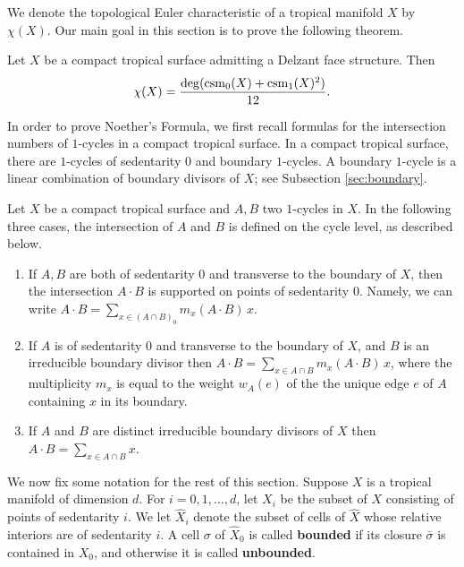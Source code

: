 We denote the topological Euler characteristic of a tropical manifold $X$ by $\chi(X)$.
Our main goal in this section is to prove the following theorem.  

\begin{thm}
\label{thm:Noether}
Let $X$ be a compact tropical surface admitting a Delzant face structure.
Then 
$$\chi(X) = \frac{\deg (\operatorname{csm}_0(X) + \operatorname{csm}_1(X)^2) }{12}.$$
\end{thm}




In order to prove Noether's Formula, we first recall formulas for the intersection numbers of $1$-cycles in a compact tropical surface. In a  compact tropical surface, there are  $1$-cycles of sedentarity $0$ and boundary $1$-cycles. A boundary $1$-cycle  is a linear combination of boundary divisors of $X$; see Subsection \ref{sec:boundary}. 


\begin{prop}\cite[Section 3.5]{Shaw:Surf}\label{prop:intersections}
Let $X$ be a compact tropical surface and $A, B$ two $1$-cycles in $X$. In the following three cases, the intersection of $A$ and $B$ is defined on the cycle level, as described below. 
\begin{enumerate}
\item If  $A, B$ are both of sedentarity $0$ and transverse to the boundary of $X$, then the intersection $A \cdot B$ is supported on points of sedentarity $0$. Namely, we can write $A\cdot B =  \sum_{x \in (A \cap B)_{0}} m_x(A \cdot B) \, x $. 
\item If $A$ is of sedentarity $0$ and transverse to the boundary of $X$, and $B$
 is an irreducible boundary divisor then $A\cdot B = \sum_{ x\in A \cap B} m_x(A \cdot B) \,x$, where the multiplicity $m_x$ is equal to the weight $w_A(e)$ of the the unique edge $e$ of $A$ containing $x$ in its boundary. 
\item If $A$ and $B$ are distinct irreducible boundary divisors of $X$ then
$A \cdot B = \sum_{x \in A \cap B} x$. 
\end{enumerate}
\end{prop}

We now fix some notation for the rest of this section.
Suppose $X$ is a tropical manifold of dimension $d$. 
For $i = 0,1,\dots, d$, let $X_i$ be the subset of $X$ consisting of points of sedentarity $i$. We let $\hat{X}_i$ denote the subset of cells of $\hat{X}$ whose relative interiors are of sedentarity $i$. 
A cell $\sigma$ of $\hat{X}_0$ is called {\bf bounded} if its closure $\bar{\sigma}$ is contained in $X_0$, and otherwise it is called {\bf unbounded}.

